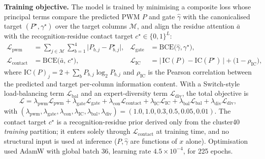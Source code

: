 \documentclass[11pt,letterpaper]{article}
\begin{document}
\noindent\textbf{Training objective.} The model is trained by minimising a composite loss whose
principal terms compare the predicted PWM $P$ and gate $\hat\gamma$ with the canonicalised target
$(P^\star,\gamma^\star)$ over the target columns $\mathcal{M}$, and align the residue attention
$\bar a$ with the recognition-residue contact target $c^\star\in\{0,1\}^{L}$:
\begin{align}
\mathcal{L}_{\mathrm{pwm}}&=\sum_{j\in\mathcal{M}}\sum_{b=1}^{4}\big|P_{b,j}-P^\star_{b,j}\big|,
&\mathcal{L}_{\mathrm{gate}}&=\mathrm{BCE}\big(\hat\gamma,\gamma^\star\big),\nonumber\\
\mathcal{L}_{\mathrm{contact}}&=\mathrm{BCE}\big(\bar a,\,c^\star\big),
&\mathcal{L}_{\mathrm{IC}}&=\big|\,\mathrm{IC}(P)-\mathrm{IC}(P^\star)\,\big|+\big(1-\rho_{\mathrm{IC}}\big),
\end{align}
where $\mathrm{IC}(P)_j=2+\sum_b P_{b,j}\log_2 P_{b,j}$ and $\rho_{\mathrm{IC}}$ is the Pearson
correlation between the predicted and target per-column information content. With a Switch-style
load-balancing term $\mathcal{L}_{\mathrm{bal}}$ and an expert-diversity term
$\mathcal{L}_{\mathrm{div}}$, the total objective is
\begin{equation}
\mathcal{L}=\lambda_{\mathrm{pwm}}\mathcal{L}_{\mathrm{pwm}}
+\lambda_{\mathrm{gate}}\mathcal{L}_{\mathrm{gate}}
+\lambda_{\mathrm{con}}\mathcal{L}_{\mathrm{contact}}
+\lambda_{\mathrm{IC}}\mathcal{L}_{\mathrm{IC}}
+\lambda_{\mathrm{bal}}\mathcal{L}_{\mathrm{bal}}
+\lambda_{\mathrm{div}}\mathcal{L}_{\mathrm{div}},
\end{equation}
with $(\lambda_{\mathrm{pwm}},\lambda_{\mathrm{gate}},\lambda_{\mathrm{con}},\lambda_{\mathrm{IC}},
\lambda_{\mathrm{bal}},\lambda_{\mathrm{div}})=(1.0,1.0,0.3,0.5,0.05,0.01)$. The contact target
$c^\star$ is a recognition-residue prior derived only from the cluster40 \emph{training} partition;
it enters solely through $\mathcal{L}_{\mathrm{contact}}$ at training time, and no structural input
is used at inference ($P,\hat\gamma$ are functions of $x$ alone). Optimisation used AdamW with
global batch 36, learning rate $4.5\times10^{-4}$, for 225 epochs.
\end{document}
